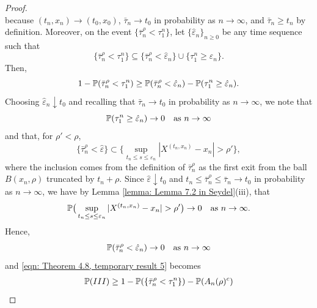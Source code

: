 \begin{proof}
\begin{equation*}
    \end{equation*}
    because $(t_n,x_n) \rightarrow (t_0,x_0)$, $\bar \tau_n \rightarrow t_0$ in probability as $n \rightarrow \infty$, and $\bar \tau_n \geq t_n$ by definition. Moreover, on the event $\{\bar \tau_n^\rho < \tau_1^n\}$, let $\{\hat \varepsilon_n\}_{n \geq 0}$ be any time sequence such that 
    \begin{equation*}
        \{ \bar \tau_n^\rho < \tau_1^n\} \subseteq \{\bar \tau_n^\rho < \hat \varepsilon_n \} \cup \{\tau_1^n \geq \hat \varepsilon_n\}. 
    \end{equation*}
    Then, 
    \begin{equation*}
        1-\mathbb{P}(\bar \tau_n^\rho < \tau_1^n) \geq \mathbb{P}(\bar \tau_n^\rho < \hat \varepsilon_n) - \mathbb{P}(\tau_1^n \geq \hat \varepsilon_n). 
    \end{equation*}
    Choosing $\hat \varepsilon_n \downarrow t_0$ and recalling that $\bar \tau_n \rightarrow t_0$ in probability as $n \rightarrow \infty$, we note that 
    \begin{equation*}
        \mathbb{P} (\tau_1^n \geq \hat \varepsilon_n) \rightarrow 0 \quad \text{as }  n \rightarrow \infty
    \end{equation*}
    and that, for $\rho' < \rho$, 
    \begin{equation*}
        \{\bar \tau_n^\rho < \hat \varepsilon\} \subset \big\{ \sup_{t_n \leq s \leq \varepsilon_n} |X^{(t_n,x_n)} - x_n| > \rho' \big\},
    \end{equation*}
    where the inclusion comes from the definition of $\bar \tau_n^\rho$ as the first exit from the ball $B(x_n,\rho)$ truncated by $t_n + \rho$. Since $\hat \varepsilon \downarrow t_0$ and $t_n \leq \bar \tau_n^\rho \leq \bar \tau_n \rightarrow t_0$ in probability as $n \rightarrow \infty$, we have by Lemma \ref{lemma: Lemma 7.2 in Seydel}(iii), that 
    \begin{equation*}
        \mathbb{P} \big( \sup_{t_n \leq s \leq \varepsilon_n} |X^{(t_n,x_n)} - x_n| > \rho' \big) \rightarrow 0 \quad \text{as } n \rightarrow \infty.
    \end{equation*}
    Hence, 
    \begin{equation*}
        \mathbb{P}(\bar \tau_n^\rho < \hat \varepsilon_n) \rightarrow 0 \quad \text{as } n \rightarrow \infty
    \end{equation*}
    and \eqref{eqn: Theorem 4.8, temporary result 5} becomes
    \begin{align*}
        \Prob(III) &\geq 1 - \Prob(\{\bar \tau_n^\rho < \tau_1^n\})  - \Prob(A_n(\rho)^c)  \\

\end{align*}
\end{proof}
